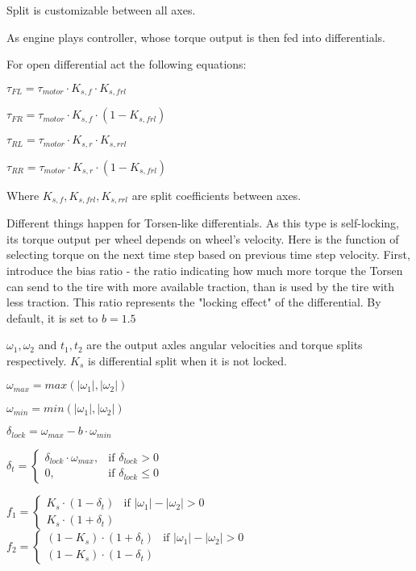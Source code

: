 \documentclass[a4paper,11pt]{article}
\begin{document}
Split is customizable between all axes.

As engine plays controller, whose torque output is then fed into differentials. 

For open differential act the following equations:

$
\tau_{FL} = \tau_{motor} \cdot K_{s,f} \cdot K_{s,frl}
$

$
\tau_{FR} = \tau_{motor} \cdot K_{s,f} \cdot (1 - K_{s,frl})
$

$
\tau_{RL} = \tau_{motor} \cdot K_{s,r} \cdot K_{s,rrl}
$

$
\tau_{RR} = \tau_{motor} \cdot K_{s,r} \cdot (1 - K_{s,frl})
$


Where $K_{s,f}, K_{s,frl}, K_{s,rrl}$ are split coefficients between axes.

Different things happen for Torsen-like differentials. 
As this type is self-locking, its torque output per wheel depends on wheel's velocity. Here is the function of selecting torque on the next time step based on previous time step velocity. First, introduce the bias ratio - the ratio indicating how much more torque the Torsen can send to the tire with more available traction, than is used by the tire with less traction. This ratio represents the "locking effect" of the differential. By default, it is set to $b = 1.5$

$\omega_1, \omega_2$ and $t_1, t_2$ are the output axles angular velocities and torque splits respectively. $K_s$ is differential split when it is not locked.

$
\omega_{max} = max(|\omega_1|, |\omega_2|)
$

$
\omega_{min} = min(|\omega_1|, |\omega_2|)
$

$
\delta_{lock} = \omega_{max} - b \cdot \omega_{min}
$

$
\delta_t = 
\begin{cases}
	\delta_{lock} \cdot \omega_{max}, & \mbox{if } \delta_{lock} > 0 \\
	0, & \mbox{if } \delta_{lock} \leq 0
\end{cases}
$

$
f_1 = 
\begin{cases}
	K_s \cdot (1 - \delta_t) & \mbox{if } |\omega_1| - |\omega_2| > 0 \\
	K_s \cdot (1 + \delta_t)
\end{cases}
$
$
f_2 = 
\begin{cases}
	(1 - K_s) \cdot (1 + \delta_t) & \mbox{if } |\omega_1| - |\omega_2| > 0 \\
	(1 - K_s) \cdot (1 - \delta_t)
\end{cases}
$
\end{document}
